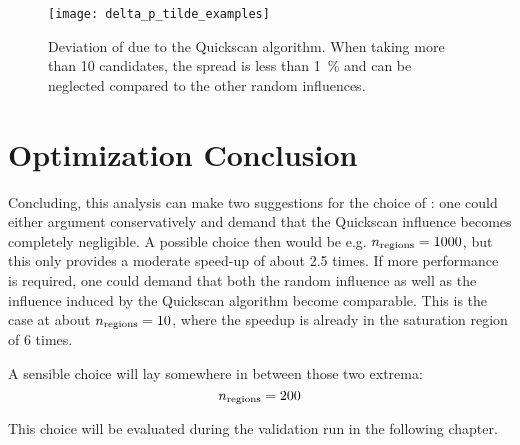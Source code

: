 \begin{figure}[htbp]
	\centering
	\texttt{[image: delta\_p\_tilde\_examples]}
	\caption{Deviation of \sigmarel due to the Quickscan algorithm. When taking more than \num{10} candidates, the spread is less than \SI{1}{\percent} and can be neglected compared to the other random influences.}
	\label{fig:delta_p_tilde_examples}
\end{figure}




\section{Optimization Conclusion}
Concluding, this analysis can make two suggestions for the choice of \paramregions: one could either argument conservatively and demand that the Quickscan influence becomes completely negligible. A possible choice then would be e.g. ${n_\mathrm{regions}} = \num{1000}$, but this only provides a moderate speed-up of about \num{2.5} times. 
If more performance is required, one could demand that both the random influence as well as the influence induced by the Quickscan algorithm become comparable. This is the case at about ${n_\mathrm{regions}} = \num{10}$, where the speedup is already in the saturation region of \num{6} times.

A sensible choice will lay somewhere in between those two extrema:
\begin{equation}
	{n_\mathrm{regions}} = \num{200}
\end{equation}

This choice will be evaluated during the validation run in the following chapter.
